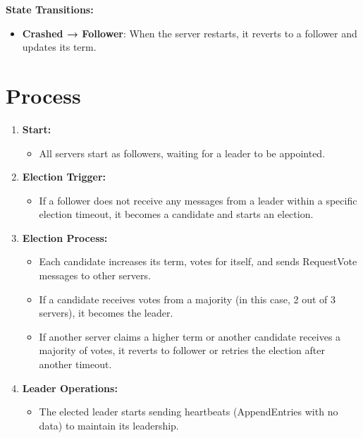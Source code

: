 \textbf{State Transitions:}
\begin{itemize}
    \item \textbf{Crashed → Follower}: When the server restarts, it reverts to a
        follower and updates its term.
\end{itemize}

\section{Process}

\begin{enumerate}
    \item \textbf{Start:}
        \begin{itemize}
            \item All servers start as followers, waiting for a leader to be
                appointed.
        \end{itemize}

    \item \textbf{Election Trigger:}
        \begin{itemize}
            \item If a follower does not receive any messages from a leader within
                a specific election timeout, it becomes a candidate and starts
                an election.
        \end{itemize}

    \item \textbf{Election Process:}
        \begin{itemize}
            \item Each candidate increases its term, votes for itself, and sends
                RequestVote messages to other servers.

            \item If a candidate receives votes from a majority (in this case, 2
                out of 3 servers), it becomes the leader.

            \item If another server claims a higher term or another candidate receives
                a majority of votes, it reverts to follower or retries the
                election after another timeout.
        \end{itemize}

    \item \textbf{Leader Operations:}
        \begin{itemize}
            \item The elected leader starts sending heartbeats (AppendEntries
                with no data) to maintain its leadership.


\end{itemize}
\end{enumerate}
